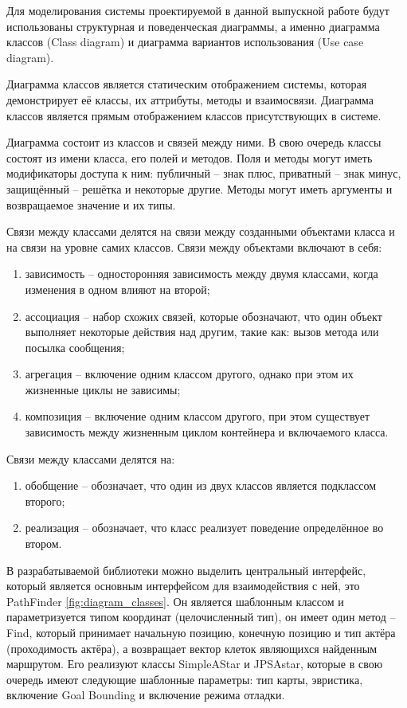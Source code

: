 Для моделирования системы проектируемой в данной выпускной работе будут использованы структурная и поведенческая диаграммы, а именно диаграмма классов (Class diagram) и диаграмма вариантов использования (Use case diagram).

Диаграмма классов является статическим отображением системы, которая демонстрирует её классы, их аттрибуты, методы и взаимосвязи. Диаграмма классов является прямым отображением классов присутствующих в системе.

Диаграмма состоит из классов и связей между ними. В свою очередь классы состоят из имени класса, его полей и методов. Поля и методы могут иметь модификаторы доступа к ним: публичный -- знак плюс, приватный -- знак минус, защищённый -- решётка и некоторые другие. Методы могут иметь аргументы и возвращаемое значение и их типы.

Связи между классами делятся на связи между созданными объектами класса и на связи на уровне самих классов. Связи между объектами включают в себя:

\begin{enumerate}
	\item зависимость -- односторонняя зависимость между двумя классами, когда изменения в одном влияют на второй;
	\item ассоциация -- набор схожих связей, которые обозначают, что один объект выполняет некоторые действия над другим, такие как: вызов метода или посылка сообщения;
	\item агрегация -- включение одним классом другого, однако при этом их жизненные циклы не зависимы;
	\item композиция -- включение одним классом другого, при этом существует зависимость между жизненным циклом контейнера и включаемого класса.
\end{enumerate}

Связи между классами делятся на:

\begin{enumerate}
	\item обобщение -- обозначает, что один из двух классов является подклассом второго;
	\item реализация -- обозначает, что класс реализует поведение определённое во втором.
\end{enumerate}


В разрабатываемой библиотеки можно выделить центральный интерфейс, который является основным интерфейсом для взаимодействия с ней, это PathFinder \cref{fig:diagram_classes}. Он является шаблонным классом и параметризуется типом координат (целочисленный тип), он имеет один метод -- Find, который принимает начальную позицию, конечную позицию и тип актёра (проходимость актёра), а возвращает вектор клеток являющихся найденным маршрутом. Его реализуют классы SimpleAStar и JPSAstar, которые в свою очередь имеют следующие шаблонные параметры: тип карты, эвристика, включение Goal Bounding и включение режима отладки.  

